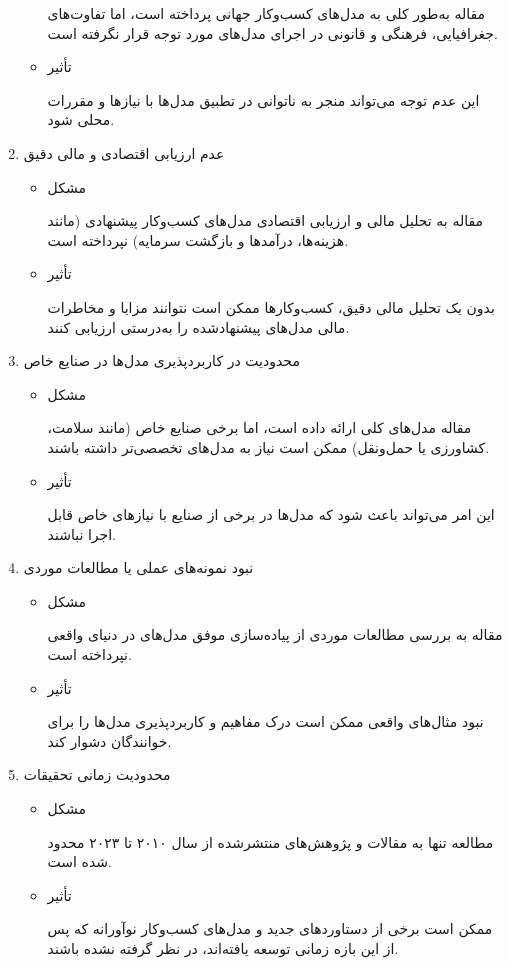 \documentclass[10pt, twocolumn]{article}
\begin{document}
\begin{enumerate}
\begin{itemize}
مقاله به‌طور کلی به مدل‌های کسب‌وکار جهانی پرداخته است، اما تفاوت‌های جغرافیایی، فرهنگی و قانونی در اجرای مدل‌های  مورد توجه قرار نگرفته است.  
\item 
تأثیر

این عدم توجه می‌تواند منجر به ناتوانی در تطبیق مدل‌ها با نیازها و مقررات محلی شود.  
\end{itemize}

\item 
عدم ارزیابی اقتصادی و مالی دقیق  

\begin{itemize}
\item 
مشکل

مقاله به تحلیل مالی و ارزیابی اقتصادی مدل‌های کسب‌وکار پیشنهادی (مانند هزینه‌ها، درآمدها و بازگشت سرمایه) نپرداخته است.  
\item 
تأثیر

بدون یک تحلیل مالی دقیق، کسب‌وکارها ممکن است نتوانند مزایا و مخاطرات مالی مدل‌های پیشنهادشده را به‌درستی ارزیابی کنند.  
\end{itemize}
\item 
محدودیت در کاربردپذیری مدل‌ها در صنایع خاص  

\begin{itemize}
\item 
مشکل

مقاله مدل‌های کلی ارائه داده است، اما برخی صنایع خاص (مانند سلامت، کشاورزی یا حمل‌ونقل) ممکن است نیاز به مدل‌های تخصصی‌تر داشته باشند.  
\item 
تأثیر

این امر می‌تواند باعث شود که مدل‌ها در برخی از صنایع با نیازهای خاص قابل اجرا نباشند.  
\end{itemize}

\item 
نبود نمونه‌های عملی یا مطالعات موردی  
 
\begin{itemize}
\item 
مشکل

مقاله به بررسی مطالعات موردی از پیاده‌سازی موفق مدل‌های  در دنیای واقعی نپرداخته است.  
\item 
تأثیر

نبود مثال‌های واقعی ممکن است درک مفاهیم و کاربردپذیری مدل‌ها را برای خوانندگان دشوار کند.  
\end{itemize}
\item 
محدودیت زمانی تحقیقات  

\begin{itemize}
\item 
مشکل

مطالعه تنها به مقالات و پژوهش‌های منتشرشده از سال ۲۰۱۰ تا ۲۰۲۳ محدود شده است.  
\item 
تأثیر

ممکن است برخی از دستاوردهای جدید و مدل‌های کسب‌وکار نوآورانه که پس از این بازه زمانی توسعه یافته‌اند، در نظر گرفته نشده باشند.  
\end{itemize}
\end{enumerate}
\end{document}

